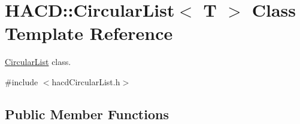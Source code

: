 \hypertarget{class_h_a_c_d_1_1_circular_list}{\section{H\+A\+C\+D\+:\+:Circular\+List$<$ T $>$ Class Template Reference}
\label{class_h_a_c_d_1_1_circular_list}
}


\hyperlink{class_h_a_c_d_1_1_circular_list}{Circular\+List} class.  




{\ttfamily \#include $<$hacd\+Circular\+List.\+h$>$}

\subsection*{Public Member Functions}

